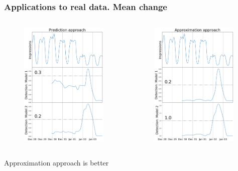 \documentclass[intlimits, 9pt, unicode]{beamer}
\begin{document}
\begin{frame}
    \frametitle{Applications to real data. Mean change}
  \begin{columns}[T,onlytextwidth]
	\begin{figure}
	\includegraphics[height=6cm]{images/methods_comparison_1_1}
	\end{figure}
	
	\begin{figure}
	\includegraphics[height=6cm]{images/methods_comparison_1_2}
	\end{figure}
	
     \end{columns}

 \medskip
     \hfill Approximation approach is better

\end{frame}
\end{document}
